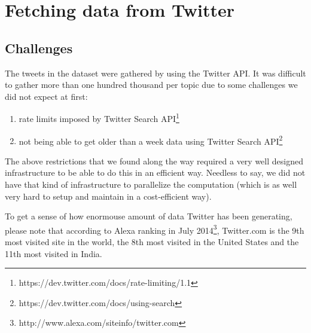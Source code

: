 \section{Fetching data from Twitter}
\label{sec:fetch-data}

\subsection{Challenges}
\label{subsec:challenges-twitter}

The tweets in the dataset were gathered by using the Twitter API. It was difficult to gather more than one hundred thousand per topic due to some challenges we did not expect at first:
\begin{enumerate}
	\item rate limits imposed by Twitter Search API\footnote{\label{rate-limit}https://dev.twitter.com/docs/rate-limiting/1.1}
    \item not being able to get older than a week data using Twitter Search API\footnote{\label{twitter-one-week}https://dev.twitter.com/docs/using-search}
\end{enumerate}

The above restrictions that we found along the way required a very well designed infrastructure to be able to do this in an efficient way. Needless to say, we did not have that kind of infrastructure to parallelize the computation (which is as well very hard to setup and maintain in a cost-efficient way).

To get a sense of how enormouse amount of data Twitter has been generating, please note that according to Alexa ranking in July 2014\footnote{\label{alexa-twitter}http://www.alexa.com/siteinfo/twitter.com}, Twitter.com is the 9th most visited site in the world, the 8th most visited in the United States and the 11th most visited in India.

